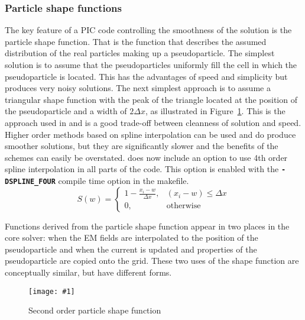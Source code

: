 \documentclass[12pt,a4paper]{article}
\newcommand{\inlinecode}[1]{{\color{warwickred} \bf\texttt{#1}}}
\newcommand{\EPOCH}{{\color{warwickdark}\fontfamily{phv}\selectfont{EPOCH}}}
\newcommand{\captionedimage}[3]
  {{\begin{figure}[hbt!]\centering\texttt{[image: \#1]}\caption{#3}\label{#2}
    \end{figure}}}
\begin{document}
\subsubsection{Particle shape functions}
The key feature of a PIC code controlling the smoothness of the solution is the
particle shape function. That is the function that describes the assumed
distribution of the real particles making up a pseudoparticle. The simplest
solution is to assume that the pseudoparticles uniformly fill the cell in which
the pseudoparticle is located. This has the advantages of speed and simplicity
but produces very noisy solutions. The next simplest approach is to assume a
triangular shape function with the peak of the triangle located at the position
of the pseudoparticle and a width of $ 2 \Delta x$, as illustrated in
Figure~\ref{shape}. This is the approach used
in {\EPOCH} and is a good trade-off between cleanness of solution and
speed. Higher order methods based on spline interpolation can be used and do
produce smoother solutions, but they are significantly slower and the benefits
of the schemes can easily be overstated. {\EPOCH} does now include an option to
use 4th order spline interpolation in all parts of the code. This option is
enabled with the \inlinecode{-DSPLINE\_FOUR} compile time option in the
makefile.\\
\[
S(w) =
\begin{cases}
1 - \frac{x_i-w}{\Delta x}, & (x_i-w) \le \Delta x \\
0, & \mbox{otherwise}
\end{cases}
\]

Functions derived from the particle shape function appear in two places in the
core solver: when the EM fields are interpolated to the position of the
pseudoparticle and when the current is updated and properties of the
pseudoparticle are copied onto the grid. These two uses of the shape function
are conceptually similar, but have different forms.

\captionedimage{./images/shape}{shape}{Second order particle shape function}
\end{document}
